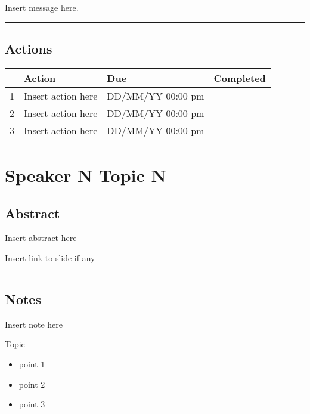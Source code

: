 \documentclass[
]{book}
\providecommand{\tightlist}{%
  \setlength{\itemsep}{0pt}\setlength{\parskip}{0pt}}
\begin{document}
Insert message here.

\begin{center}\rule{0.5\linewidth}{0.5pt}\end{center}

\hypertarget{actions-1}{%
\section*{Actions}\label{actions-1}}

\begin{longtable}[]{@{}llll@{}}
\toprule
& Action & Due & Completed \\
\midrule
\endhead
1 & Insert action here & DD/MM/YY 00:00 pm & \\
2 & Insert action here & DD/MM/YY 00:00 pm & \\
3 & Insert action here & DD/MM/YY 00:00 pm & \\
\bottomrule
\end{longtable}

\hypertarget{speaker-n-topic-n-2}{%
\chapter{Speaker N Topic N}\label{speaker-n-topic-n-2}}

\hypertarget{abstract-2}{%
\section*{Abstract}\label{abstract-2}}

Insert abstract here

Insert \href{}{link to slide} if any

\begin{center}\rule{0.5\linewidth}{0.5pt}\end{center}

\hypertarget{notes-2}{%
\section*{Notes}\label{notes-2}}

Insert note here

Topic

\begin{itemize}
\tightlist
\item
  point 1
\item
  point 2
\item
  point 3
\end{itemize}
\end{document}
